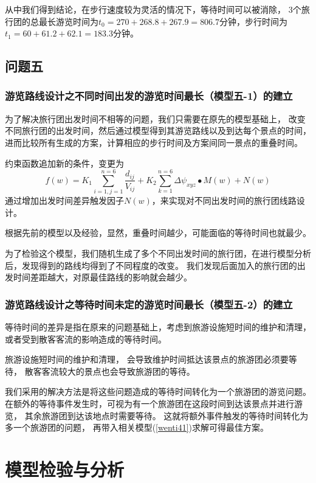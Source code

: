 \documentclass[hyperref,UTF8]{article}
\begin{document}
{从中我们得到结论，在步行速度较为灵活的情况下，等待时间可以被消除，
3个旅行团的总最长游览时间为$t_0=270+268.8+267.9=806.7$分钟，步行时间为$t_1=60+61.2+62.1=183.3$分钟。

\subsection{问题五}
\subsubsection{游览路线设计之不同时间出发的游览时间最长（模型五-1）的建立}
为了解决旅行团出发时间不相等的问题，我们只需要在原先的模型基础上，
改变不同旅行团的出发时间，然后通过模型得到其游览路线以及到达每个景点的时间，
进而比较所有生成的方案，计算相应的步行时间及方案间同一景点的重叠时间。

约束函数追加新的条件，变更为
\begin{equation}\label{wenti51}
f(w)=K_1\sum_{i=1,j=1}^{n=6}\frac{ d_{ij}}{V_{ij}}+K_2\sum_{k=1}^{n=6}\Delta {\psi}_{xyz}\bullet M(w)+N(w)
\end{equation}
通过增加出发时间差异触发因子$N(w)$，来实现对不同出发时间的旅行团线路设计。

根据先前的模型以及经验，显然，重叠时间越少，可能面临的等待时间也就最少。

为了检验这个模型，我们随机生成了多个不同出发时间的旅行团，在进行模型分析后，发现得到的路线均得到了不同程度的改变。
我们发现后面加入的旅行团的出发时间差距越大，对原最佳路线的影响就会越少。
\subsubsection{游览路线设计之等待时间未定的游览时间最长（模型五-2）的建立}
等待时间的差异是指在原来的问题基础上，考虑到旅游设施短时间的维护和清理，
或者受到散客客流的影响造成的等待时间。

旅游设施短时间的维护和清理，
会导致维护时间抵达该景点的旅游团必须要等待，
散客客流较大的景点也会导致旅游团的等待。

我们采用的解决方法是将这些问题造成的等待时间转化为一个旅游团的游览问题。
在额外的等待事件发生时，可视为有一个旅游团在这段时间到达该景点并进行游览，
其余旅游团到达该地点时需要等待。
这就将额外事件触发的等待时间转化为多一个旅游团的问题，
再带入相关模型(\ref{wenti41})求解可得最佳方案。




\section{模型检验与分析}
}
\end{document}
